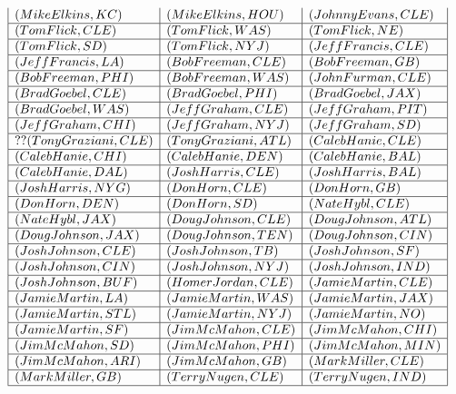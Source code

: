\documentclass{ximera}
\begin{document}
\begin{center}
\[\begin{array}{|l|l|l|}
(Mike Elkins, KC) & (Mike Elkins, HOU) & (Johnny Evans, CLE) \\\hline 
(Tom Flick, CLE) & (Tom Flick, WAS) &  (Tom Flick, NE) \\\hline  
(Tom Flick, SD) & (Tom Flick, NYJ) & (Jeff Francis, CLE) \\\hline 
(Jeff Francis, LA) & (Bob Freeman, CLE) & (Bob Freeman, GB) \\\hline 
(Bob Freeman, PHI) & (Bob Freeman, WAS) & (John Furman, CLE) \\\hline 
(Brad Goebel, CLE) & (Brad Goebel, PHI) & (Brad Goebel, JAX) \\\hline 
(Brad Goebel, WAS) & (Jeff Graham, CLE) & (Jeff Graham, PIT) \\\hline 
(Jeff Graham, CHI) & (Jeff Graham, NYJ) & (Jeff Graham, SD) \\\hline ??
(Tony Graziani, CLE) & (Tony Graziani, ATL) & (Caleb Hanie, CLE) \\\hline 
(Caleb Hanie, CHI) & (Caleb Hanie, DEN) & (Caleb Hanie, BAL) \\\hline 
(Caleb Hanie, DAL) & (Josh Harris, CLE) & (Josh Harris, BAL) \\\hline 
(Josh Harris, NYG) & (Don Horn, CLE) & (Don Horn, GB) \\\hline 
(Don Horn, DEN) & (Don Horn, SD) & (Nate Hybl, CLE) \\\hline 
(Nate Hybl, JAX) & (Doug Johnson, CLE) & (Doug Johnson, ATL) \\\hline 
(Doug Johnson, JAX) & (Doug Johnson, TEN) & (Doug Johnson, CIN) \\\hline
(Josh Johnson, CLE) & (Josh Johnson, TB) & (Josh Johnson, SF) \\\hline 
(Josh Johnson, CIN) & (Josh Johnson, NYJ) & (Josh Johnson, IND) \\\hline 
(Josh Johnson, BUF) & (Homer Jordan, CLE) & (Jamie Martin, CLE) \\\hline 
(Jamie Martin, LA) & (Jamie Martin, WAS) & (Jamie Martin, JAX) \\\hline
(Jamie Martin, STL) & (Jamie Martin, NYJ) & (Jamie Martin, NO) \\\hline 
(Jamie Martin, SF) & (Jim McMahon, CLE) & (Jim McMahon, CHI) \\\hline 
(Jim McMahon, SD) & (Jim McMahon, PHI) & (Jim McMahon, MIN) \\\hline 
(Jim McMahon, ARI) & (Jim McMahon, GB) & (Mark Miller, CLE) \\\hline 
(Mark Miller, GB) &(Terry Nugen, CLE) & (Terry Nugen, IND) \\\hline 

\end{array}\]
\end{center}
\end{document}
